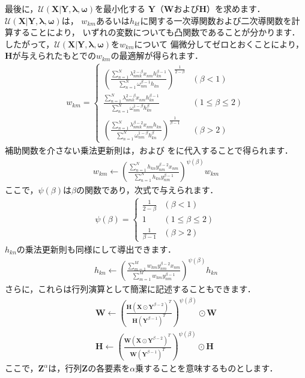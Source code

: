 最後に，$\mathcal{U}(\bm{X}|\bm{Y},\bm\lambda,\bm\omega)$を最小化する
$\bm{Y}$（$\bm{W}$および$\bm{H}$）を求めます．
$\mathcal{U}(\bm{X}|\bm{Y},\bm\lambda,\bm\omega)$は，
$w_{km}$あるいは$h_{kt}$に関する一次導関数および二次導関数を計算することにより，
いずれの変数についても凸関数であることが分かります\cite{nakano:mlsp:2010}．
したがって，$\mathcal{U}(\bm{X}|\bm{Y},\bm\lambda,\bm\omega)$を$w_{km}$について
偏微分してゼロとおくことにより，$\bm{H}$が与えられたもとでの$w_{km}$の最適解が得られます．
\begin{align}
 w_{km} = 
 \left\{
 \begin{array}{ll}
  \left(
  \frac
   {\sum_{n=1}^N \lambda_{nmk}^{2 - \beta} x_{nm} h_{kn}^{\beta - 1}}
   {\sum_{n=1}^N \omega_{nm}^{\beta - 1} h_{kn}}
  \right)^{\frac{1}{2 - \beta}}
   &
   (\beta < 1)
   \\
  \frac
   {\sum_{n=1}^N \lambda_{nmk}^{2 - \beta} x_{nm} h_{kn}^{\beta - 1}}
   {\sum_{n=1}^N \omega_{nm}^{1 - \beta} h_{kn}^\beta}
   &
   (1 \le \beta \le 2)
   \\
  \left(
  \frac
   {\sum_{n=1}^N \lambda_{nmk}^{\beta - 2} x_{nm} h_{kn}}
   {\sum_{n=1}^N \omega_{nm}^{1 - \beta} h_{kn}^\beta}
  \right)^{\frac{1}{\beta - 1}}
   &
   (\beta > 2)
 \end{array}
 \right.
 \label{eqn:beta_nmf_mu_w}
\end{align}
補助関数を介さない乗法更新則は，および
をに代入することで得られます．
\begin{align}
w_{km} 
\gets 
   \left(
   \frac
   {\sum_{n=1}^N h_{kn} y_{nm}^{\beta - 2} x_{nm}}
   {\sum_{n=1}^N h_{kn} y_{nm}^{\beta - 1}}
   \right)^{\psi(\beta)}
 w_{km}
\end{align}
ここで，$\psi(\beta)$は$\beta$の関数であり，次式で与えられます．
\begin{align}
\psi(\beta) 
= 
\left\{
\begin{array}{ll}
\frac{1}{2 - \beta} & (\beta < 1)
\\
1 &  (1 \le \beta \le 2)
\\
\frac{1}{\beta - 1} & (\beta > 2)
\end{array}
\right.
\end{align}
$h_{kn}$の乗法更新則も同様にして導出できます．
\begin{align}
h_{kn} 
\gets 
   \left(
   \frac
   {\sum_{m=1}^M w_{km} y_{nm}^{\beta - 2} x_{nm}}
   {\sum_{m=1}^M w_{km} y_{nm}^{\beta - 1}}
   \right)^{\psi(\beta)}
 h_{kn}
\end{align}
さらに，これらは行列演算として簡潔に記述することもできます．
\begin{align}
\bm{W} \gets 
\left(
\frac{\bm{H} \left(\bm{X} \odot \bm{Y}^{\beta - 2}\right)^T}
                  {\bm{H} \left(\bm{Y}^{\beta - 1}\right)^T}
\right)^{\psi(\beta)}
 \odot \bm{W}
\label{eqn:beta_nmf_mu_W}
\\
\bm{H} \gets 
\left(
\frac{\bm{W} \left(\bm{X} \odot \bm{Y}^{\beta - 2}\right)^T}
                  {\bm{W} \left(\bm{Y}^{\beta - 1}\right)^T}
\right)^{\psi(\beta)}
 \odot \bm{H}
\label{eqn:beta_nmf_mu_H}
\end{align}
ここで，$\bm{Z}^\alpha$は，行列$\bm{Z}$の各要素を$\alpha$乗することを意味するものとします．

